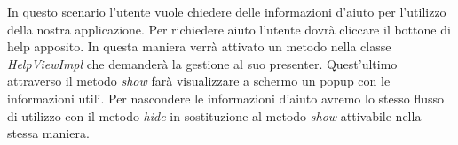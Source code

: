 In questo scenario l'utente vuole chiedere delle informazioni d'aiuto per l'utilizzo della nostra applicazione. Per richiedere aiuto l'utente dovrà cliccare il bottone di help apposito. In questa maniera verrà attivato un metodo nella classe \textit{HelpViewImpl} che demanderà la gestione al suo presenter. Quest'ultimo attraverso il metodo \textit{show} farà visualizzare a schermo un popup con le informazioni utili. Per nascondere le informazioni d'aiuto avremo lo stesso flusso di utilizzo con il metodo \textit{hide} in sostituzione al metodo \textit{show} attivabile nella stessa maniera.
